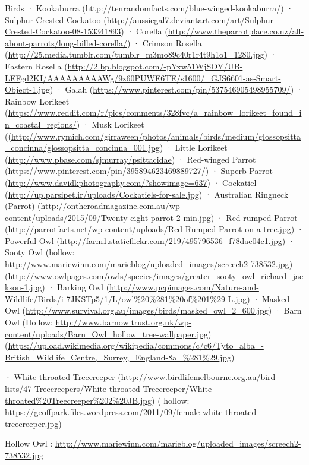 \documentclass{subfiles}
\begin{document}
	Birds
	· Kookaburra (\url{http://tenrandomfacts.com/blue-winged-kookaburra/}) 
	· Sulphur Crested Cockatoo (\url{http://aussiegal7.deviantart.com/art/Sulphur-Crested-Cockatoo-08-153341893}) 
	· Corella (\url{http://www.theparrotplace.co.nz/all-about-parrots/long-billed-corella/}) 
	· Crimson Rosella (\url{http://25.media.tumblr.com/tumblr_m3mo89c40r1r4t9h1o1_1280.jpg}) 
	· Eastern Rosella (\url{http://2.bp.blogspot.com/-pYxw51WjSOY/UB-LEFgd2KI/AAAAAAAAAWg/9z60PUWE6TE/s1600/_GJS6601-as-Smart-Object-1.jpg}) 
	· Galah (\url{https://www.pinterest.com/pin/537546905498955709/}) 
	· Rainbow Lorikeet (\url{https://www.reddit.com/r/pics/comments/328fvc/a_rainbow_lorikeet_found_in_coastal_regions/}) 
	· Musk Lorikeet ((\url{http://www.rymich.com/girraween/photos/animals/birds/medium/glossopsitta_concinna/glossopsitta_concinna_001.jpg})
	· Little Lorikeet (\url{http://www.pbase.com/sjmurray/psittacidae})
	· Red-winged Parrot (\url{https://www.pinterest.com/pin/395894623469889727/})
	· Superb Parrot (\url{http://www.davidkphotography.com/?showimage=637})
	· Cockatiel  (\url{http://up.parsipet.ir/uploads/Cockatiels-for-sale.jpg})
	· Australian Ringneck (Parrot) (\url{http://ontheroadmagazine.com.au/wp-content/uploads/2015/09/Twenty-eight-parrot-2-min.jpg})
	· Red-rumped Parrot (\url{http://parrotfacts.net/wp-content/uploads/Red-Rumped-Parrot-on-a-tree.jpg})
	· Powerful Owl (\url{http://farm1.staticflickr.com/219/495796536_f78dac04c1.jpg})
	· Sooty Owl  (hollow: \url{http://www.mariewinn.com/marieblog/uploaded_images/screech2-738532.jpg})
	(\url{http://www.owlpages.com/owls/species/images/greater_sooty_owl_richard_jackson-1.jpg})
	· Barking Owl (\url{http://www.pcpimages.com/Nature-and-Wildlife/Birds/i-7JKSTp5/1/L/owl\%20\%281\%20of\%201\%29-L.jpg}) 
	· Masked Owl (\url{http://www.survival.org.au/images/birds/masked_owl_2_600.jpg}) 
	· Barn Owl  (Hollow: \url{http://www.barnowltrust.org.uk/wp-content/uploads/Barn_Owl_hollow_tree-wallpaper.jpg}) 
	(\url{https://upload.wikimedia.org/wikipedia/commons/c/c6/Tyto_alba_-British_Wildlife_Centre,_Surrey,_England-8a_\%281\%29.jpg})
	
	· White-throated Treecreeper (\url{http://www.birdlifemelbourne.org.au/bird-lists/47-Treecreepers/White-throated-Treecreeper/White-throated\%20Treecreeper\%202\%20JB.jpg}) 
	( hollow: \url{https://geoffpark.files.wordpress.com/2011/09/female-white-throated-treecreeper.jpg}) 
	
	Hollow Owl : \url{http://www.mariewinn.com/marieblog/uploaded_images/screech2-738532.jpg}
	
\end{document}

